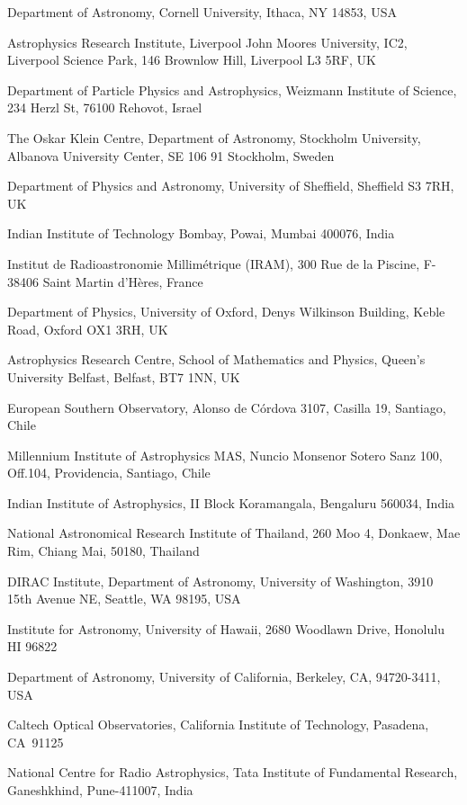 \documentclass{nature_plusfigure}
\begin{document}
\begin{small}
\begin{affiliations}
\item Department of Astronomy, Cornell University, Ithaca, NY 14853, USA
\item Astrophysics Research Institute, Liverpool John Moores University, IC2, Liverpool Science Park, 146 Brownlow Hill, Liverpool L3 5RF, UK
\item Department of Particle Physics and Astrophysics, Weizmann Institute of Science, 234 Herzl St, 76100 Rehovot, Israel
\item The Oskar Klein Centre, Department of Astronomy, Stockholm University, Albanova University Center, SE 106 91 Stockholm, Sweden
\item Department of Physics and Astronomy, University of Sheffield, Sheffield S3 7RH, UK
\item Indian Institute of Technology Bombay, Powai, Mumbai 400076, India
\item Institut de Radioastronomie Millimétrique (IRAM), 300 Rue de la Piscine, F-38406 Saint Martin d’Hères, France
\item Department of Physics, University of Oxford, Denys Wilkinson Building, Keble Road, Oxford OX1 3RH, UK
\item Astrophysics Research Centre, School of Mathematics and Physics, Queen’s University Belfast, Belfast, BT7 1NN, UK
\item European Southern Observatory, Alonso de C\'ordova 3107, Casilla 19, Santiago, Chile
\item Millennium Institute of Astrophysics MAS, Nuncio Monsenor Sotero Sanz 100, Off.104, Providencia, Santiago, Chile
\item Indian Institute of Astrophysics, II Block Koramangala, Bengaluru 560034, India
\item National Astronomical Research Institute of Thailand, 260 Moo 4, Donkaew, Mae Rim, Chiang Mai, 50180, Thailand
\item DIRAC Institute, Department of Astronomy, University of Washington, 3910 15th Avenue NE, Seattle, WA 98195, USA
\item Institute for Astronomy, University of Hawaii, 2680 Woodlawn Drive, Honolulu HI 96822
\item Department of Astronomy, University of California, Berkeley, CA, 94720-3411, USA 
\item Caltech Optical Observatories, California Institute of Technology, Pasadena, CA 91125
\item National Centre for Radio Astrophysics, Tata Institute of Fundamental Research, Ganeshkhind, Pune-411007, India

\end{affiliations}
\end{small}
\end{document}
